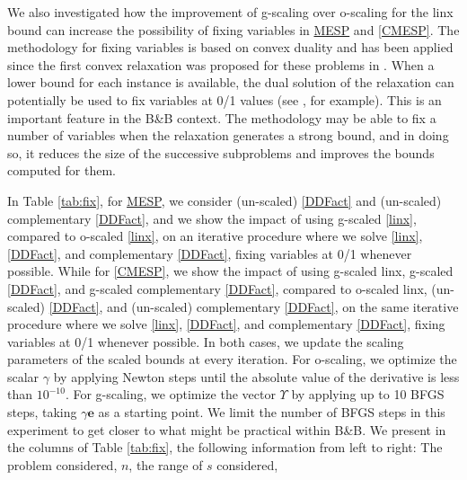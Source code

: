 \documentclass[smallextended]{svjour3hack}       %
\newcommand{\zc}[1]{\noindent{\color{red}[Zhongzhu:]\ {#1}}}
\newcommand{\mf}[1]{\noindent{\color{green}[Marcia:]\ {#1}}}
\begin{document}
{We also investigated how the improvement of g-scaling  over o-scaling for the linx bound can increase the possibility of fixing variables in \hyperlink{MESP}{MESP} and \ref{CMESP}. The methodology for  fixing variables is based on convex duality and  has been applied  since the first convex relaxation  was proposed for these problems in \cite{AFLW_IPCO}. When a lower bound for each instance
is available, the dual solution of the  relaxation can potentially be used to fix variables at 0/1 values (see \cite{FLbook}, for example).  This is an important feature in the B{\&}B context. The methodology may be able to fix a number of variables when the relaxation generates a strong bound, and in doing so, it reduces the size of the  successive subproblems and improves the bounds computed for them.

In Table \ref{tab:fix}, for \hyperlink{MESP}{MESP}, we consider  (un-scaled) \ref{DDFact} and (un-scaled)  complementary \ref{DDFact}, and we show the impact of using g-scaled \ref{linx}, compared to o-scaled \ref{linx}, on an iterative procedure where we solve \ref{linx}, \ref{DDFact}, and complementary \ref{DDFact}, fixing variables at 0/1 whenever possible.  While for \ref{CMESP}, we show the impact of using g-scaled linx, g-scaled \ref{DDFact},  and g-scaled complementary \ref{DDFact}, compared to o-scaled linx,  (un-scaled) \ref{DDFact}, and  (un-scaled) complementary \ref{DDFact}, on the same iterative procedure where we solve \ref{linx}, \ref{DDFact}, and complementary \ref{DDFact}, fixing variables at 0/1 whenever possible.
 In both cases, we update the scaling parameters of the scaled bounds at every iteration. For o-scaling, we optimize the scalar  $\gamma$ by applying Newton steps until  the absolute value of the derivative is less than $10^{-10}$. For g-scaling, we optimize the vector   $\Upsilon$ by applying up to 10 BFGS steps, taking $\gamma \mathbf{e}$ as a starting point. We limit the number of BFGS steps in this experiment to get closer to what might be practical within B\&B. We present in the columns of Table \ref{tab:fix}, the following information from left to right: The problem considered, $n$, the range of $s$ considered,
}
\end{document}

